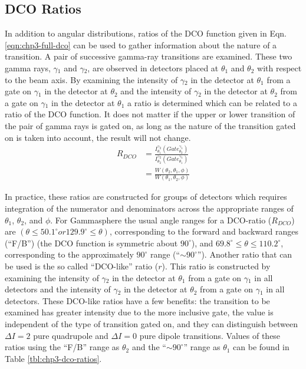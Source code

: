 \subsection{DCO Ratios}
\label{sssec:exp-pr-data-ang-cor-dco}
In addition to angular distributions, ratios of the DCO function given in Eqn. \ref{eqn:chp3-full-dco} can be used to gather information about the nature of a transition\cite{dcoRatios}. A pair of successive gamma-ray transitions are examined. These two gamma rays, $\gamma{}_1$ and $\gamma{}_2$, are observed in detectors placed at $\theta{}_1$ and $\theta{}_2$ with respect to the beam axis. By examining the intensity of $\gamma{}_2$ in the detector at $\theta_1$ from a gate on $\gamma{}_1$ in the detector at $\theta{}_2$ and the intensity of $\gamma{}_2$ in the detector at $\theta_2$ from a gate on $\gamma{}_1$ in the detector at $\theta{}_1$ a ratio is determined which can be related to a ratio of the DCO function. It does not matter if the upper or lower transition of the pair of gamma rays is gated on, as long as the nature of the transition gated on is taken into account, the result will not change.
\begin{align}
R_{DCO} &= \frac{I^{\gamma{}_2}_{\theta{}_1}(Gate^{\gamma{}_1}_{\theta{}_2})}{I^{\gamma{}_2}_{\theta{}_2}(Gate^{\gamma{}_1}_{\theta{}_1})} \label{eqn:chp3:exp-dco-ratio}\\
 &= \frac{W(\theta{}_2,\theta{}_1,\phi{})}{W(\theta{}_1,\theta{}_2,\phi{})} \label{eqn:chp3:theory-dco-ratio}
\end{align}

In practice, these ratios are constructed for groups of detectors which requires integration of the numerator and denominators across the appropriate ranges of $\theta{}_1$, $\theta{}_2$, and $\phi{}$. For Gammasphere the usual angle ranges for a DCO-ratio ($R_{DCO}$) are $(\theta{}\leq{}50.1^{\circ} or 129.9^{\circ}\leq{}\theta{})$, corresponding to the forward and backward ranges (``F/B'') (the DCO function is symmetric about $90^{\circ}$), and $69.8^{\circ}\leq{}\theta{}\leq{}110.2^{\circ}$, corresponding to the approximately $90^{\circ{}}$ range (``$\sim{}90^{\circ}$'').  Another ratio that can be used is the so called ``DCO-like'' ratio ($r$). This ratio is constructed by examining the intensity of $\gamma{}_2$ in the detector at $\theta_1$ from a gate on $\gamma{}_1$ in all detectors and the intensity of $\gamma{}_2$ in the detector at $\theta_2$ from a gate on $\gamma{}_1$ in all detectors. These DCO-like ratios have a few benefits: the transition to be examined has greater intensity due to the more inclusive gate, the value is independent of the type of transition gated on, and they can distinguish between $\Delta I=2$ pure quadrupole and $\Delta I=0$ pure dipole transitions. Values of these ratios using the ``F/B'' range as $\theta_2$ and the ``$\sim{}90^{\circ}$'' range as $\theta_1$ can be found in Table \ref{tbl:chp3-dco-ratios}.

